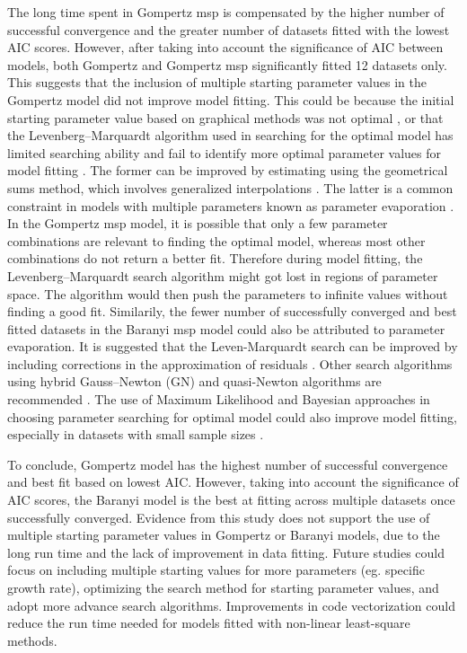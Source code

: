 \documentclass[11pt]{article}
\begin{document}
The long time spent in Gompertz msp is compensated by the higher number of successful convergence and the greater number of datasets fitted with the lowest AIC scores. However, after taking into account the significance of AIC between models, both Gompertz and Gompertz msp significantly fitted 12 datasets only. This suggests that the inclusion of multiple starting parameter values in the Gompertz model did not improve model fitting. This could be because the initial starting parameter value based on graphical methods was not optimal \cite{holmstrom_review_2002}, or that the Levenberg–Marquardt algorithm used in searching for the optimal model has limited searching ability and fail to identify more optimal parameter values for model fitting \cite{transtrum_improvements_2012}. The former can be improved by estimating using the geometrical sums method, which involves generalized interpolations \cite{holmstrom_review_2002}. The latter is a common constraint in models with multiple parameters known as parameter evaporation \cite{transtrum_why_2010}. In the Gompertz msp model, it is possible that only a few parameter combinations are relevant to finding the optimal model, whereas most other combinations do not return a better fit. Therefore during model fitting, the Levenberg–Marquardt search algorithm might got lost in regions of parameter space. The algorithm would then push the parameters to infinite values without finding a good fit. Similarily, the fewer number of successfully converged and best fitted datasets in the Baranyi msp model could also be attributed to parameter evaporation. It is suggested that the Leven-Marquardt search can be improved by including corrections in the approximation of residuals \cite{transtrum_improvements_2012}. Other search algorithms using hybrid Gauss–Newton (GN) and quasi-Newton algorithms are recommended \cite{holmstrom_review_2002}. The use of Maximum Likelihood and Bayesian approaches in choosing parameter searching for optimal model could also improve model fitting, especially in datasets with small sample sizes \cite{zondervan-zwijnenburg_pushing_2018}. 
\vspace{\baselineskip}

To conclude, Gompertz model has the highest number of successful convergence and best fit based on lowest AIC. However, taking into account the significance of AIC scores, the Baranyi model is the best at fitting across multiple datasets once successfully converged. Evidence from this study does not support the use of multiple starting parameter values in Gompertz or Baranyi models, due to the long run time and the lack of improvement in data fitting. Future studies could focus on including multiple starting values for more parameters (eg. specific growth rate), optimizing the search method for starting parameter values, and adopt more advance search algorithms. Improvements in code vectorization could reduce the run time needed for models fitted with non-linear least-square methods. 
\vspace{\baselineskip}








\end{document}

